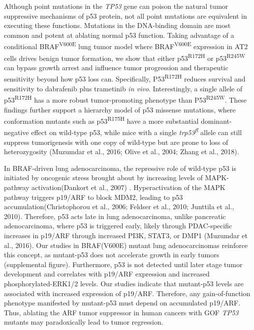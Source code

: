 Although point mutations in the \emph{TP53} gene can poison the natural tumor suppressive mechanisms of p53 protein, not all point mutations are equivalent in executing these functions. Mutations in the DNA-binding domain are most common and potent at ablating normal p53 function. Taking advantage of a conditional BRAF\textsuperscript{V600E} lung tumor model where BRAF\textsuperscript{V600E} expression in AT2 cells drives benign tumor formation, we show that either p53\textsuperscript{R172H} or p53\textsuperscript{R245W} can bypass growth arrest and influence tumor progression and therapeutic sensitivity beyond how p53 loss can. Specifically, P53\textsuperscript{R172H} reduces survival and sensitivity to dabrafenib plus trametinib \emph{in vivo}. Interestingly, a single allele of p53\textsuperscript{R172H} has a more robust tumor-promoting phenotype than P53\textsuperscript{R245W}. These findings further support a hierarchy model of p53 missense mutations, where conformation mutants such as p53\textsuperscript{R175H} have a more substantial dominant-negative effect on wild-type p53, while mice with a single \emph{trp53\textsuperscript{fl}} allele can still suppress tumorigenesis with one copy of wild-type but are prone to loss of heterozygosity (Muzumdar et al., 2016; Olive et al., 2004; Zhang et al., 2018).

In BRAF-driven lung adenocarcinoma, the repressive role of wild-type p53 is initiated by oncogenic stress brought about by increasing levels of MAPK-pathway activation(Dankort et al., 2007) . Hyperactivation of the MAPK pathway triggers p19/ARF to block MDM2, leading to p53 accumulation(Christophorou et al., 2006; Feldser et al., 2010; Junttila et al., 2010). Therefore, p53 acts late in lung adenocarcinoma, unlike pancreatic adenocarcinoma, where p53 is triggered early, likely through PDAC-specific increases in p19/ARF through increased PI3K, STAT3, or DMP1 (Muzumdar et al., 2016). Our studies in BRAF(V600E) mutant lung adenocarcinomas reinforce this concept, as mutant-p53 does not accelerate growth in early tumors (supplemental figure). Furthermore, p53 is not detected until later stage tumor development and correlates with p19/ARF expression and increased phosphorylated-ERK1/2 levels. Our studies indicate that mutant-p53 levels are associated with increased expression of p19/ARF. Therefore, any gain-of-function phenotype manifested by mutant-p53 must depend on accumulated p19/ARF. Thus, ablating the ARF tumor suppressor in human cancers with GOF \emph{TP53} mutants may paradoxically lead to tumor regression.

